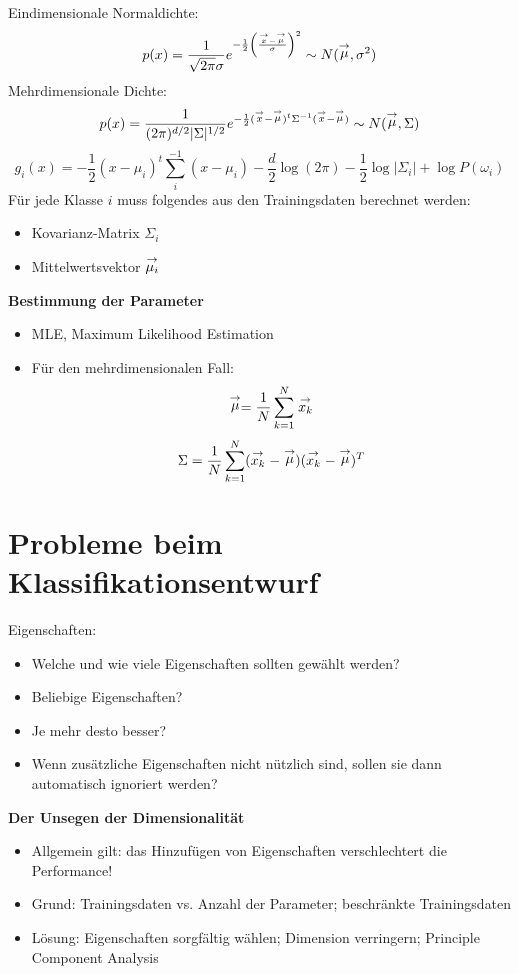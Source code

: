 Eindimensionale Normaldichte: $$p(x) = \frac{1}{\sqrt{2\pi} \sigma} e^{- \frac{1}{2} \left( \frac{\stackrel{\to}{x} - \stackrel{\to}{\mu}}{\sigma} \right)^2} \sim N(\stackrel{\to}{\mu},\sigma^2)$$
Mehrdimensionale Dichte: $$p(x) = \frac{1}{(2\pi)^{d/2}|\Sigma|^{1/2}}e^{- \frac{1}{2} ( \stackrel{\to}{x} - \stackrel{\to}{\mu})^t \Sigma^{-1} (\stackrel{\to}{x} - \stackrel{\to}{\mu}) } \sim N(\stackrel{\to}{\mu},\Sigma)$$
$$g_i(x) = - \frac{1}{2} (x - \mu_i)^t \sum_i^{-1} (x - \mu_i) - \frac{d}{2} \log(2\pi) - \frac{1}{2} \log|\Sigma_i| + \log P(\omega_i)$$
Für jede Klasse $i$ muss folgendes aus den Trainingsdaten berechnet werden:
\begin{itemize}
\item Kovarianz-Matrix $\Sigma_i$ \item Mittelwertsvektor $\stackrel{\to}{\mu_i}$
\end{itemize}
\textbf{Bestimmung der Parameter}
\begin{itemize}
\item MLE, Maximum Likelihood Estimation
\item Für den mehrdimensionalen Fall:
$$\stackrel{\to}{\mu} = \frac{1}{N} \sum\limits_{k=1}^N \stackrel{\to}{x_k}$$ $$\Sigma = \frac{1}{N} \sum\limits_{k=1}^N (\stackrel{\to}{x_k} - \stackrel{\to}{\mu})(\stackrel{\to}{x_k} - \stackrel{\to}{\mu})^T$$
\end{itemize}

\section{Probleme beim Klassifikationsentwurf}

Eigenschaften:
\begin{itemize}
\item Welche und wie viele Eigenschaften sollten gewählt werden?
\item Beliebige Eigenschaften?
\item Je mehr desto besser?
\item Wenn zusätzliche Eigenschaften nicht nützlich sind, sollen sie dann automatisch ignoriert werden?
\end{itemize}
\textbf{Der Unsegen der Dimensionalität}
\begin{itemize}
\item Allgemein gilt: das Hinzufügen von Eigenschaften verschlechtert die Performance!
\item Grund: Trainingsdaten vs. Anzahl der Parameter; beschränkte Trainingsdaten
\item Lösung: Eigenschaften sorgfältig wählen; Dimension verringern; Principle Component Analysis
\end{itemize}


